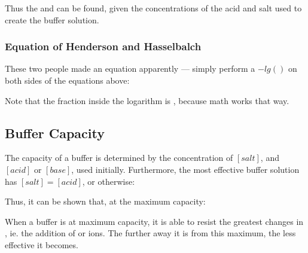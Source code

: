 

			Thus the \pH{} and \pOH{} can be found, given the concentrations of the acid and salt used to create the buffer solution.


			\subsubsection{Equation of Henderson and Hasselbalch}

				These two people made an equation apparently --- simply perform a $-lg()$ on both sides of the equations above:


				Note that the fraction inside the logarithm is , because math works that way.




		\pagebreak
		\subsection{Buffer Capacity}

			The capacity of a buffer is determined by the concentration of $[salt]$, and $[acid]$ or $[base]$, used initially. Furthermore,
			the most effective buffer solution has $[salt] = [acid]$, or otherwise:


			Thus, it can be shown that, at the maximum capacity:


			When a buffer is at maximum capacity, it is able to resist the greatest changes in \pH{}, ie. the addition of  or 
			ions. The further away it is from this maximum, the less effective it becomes.

